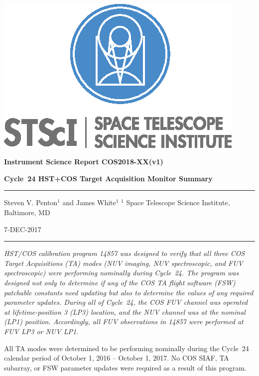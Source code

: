 \documentclass[12pt]{reportj}
\begin{document}
~\\

\vspace{-2.5cm}
\noindent\includegraphics*[width=0.295\linewidth]{new_st_logo.eps}

\vspace{-0.5cm}

\begin{flushright}
{\bf Instrument Science Report COS2018-XX(v1)}

\vspace{1.0cm}
{\bf\Huge Cycle~24 HST+COS Target Acquisition Monitor Summary}

\rule{0.25\linewidth}{0.5pt}

\vspace{0.4cm}
Steven V. Penton$^1$ and James White$^1$
\linebreak
\newline
\footnotesize{$^1$ Space Telescope Science Institute, Baltimore, MD}
\vspace{0.5cm}

7-DEC-2017
\end{flushright}
\vspace{-0.3cm}
\noindent\rule{\linewidth}{1.0pt}

{\it \noindent
HST/COS calibration program 14857 was designed to verify that all three COS Target Acquisitions (TA) modes (NUV imaging, NUV spectroscopic, and FUV spectroscopic)
 were performing nominally during Cycle~24. The program was designed not only to determine if any of the COS TA flight software (FSW) patchable constants need updating but also to determine the values of any required parameter updates.
During all of Cycle~24, the COS FUV channel was operated at lifetime-position 3 (LP3) location, and the NUV channel was at the nominal (LP1) position. Accordingly, all FUV observations in 14857 were performed at FUV LP3 or NUV LP1.

All TA modes were determined to be performing nominally during the Cycle~24 calendar period of October 1, 2016 -- October 1, 2017. No COS SIAF, TA subarray, or FSW parameter updates were required as a result of this program. }
\end{document}
